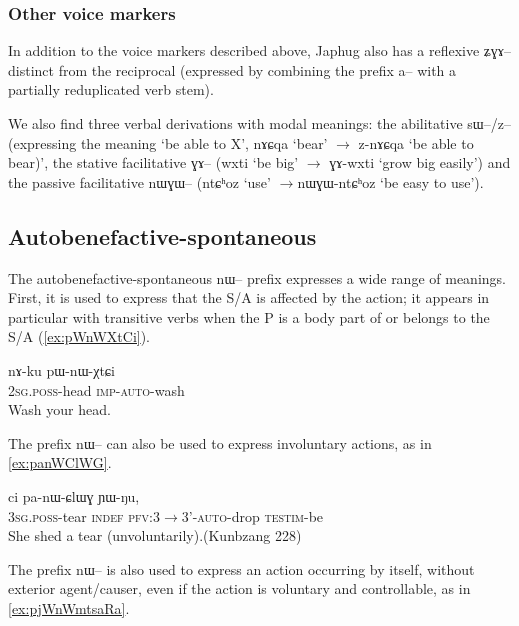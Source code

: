 \documentclass[oldfontcommands,oneside,a4paper,11pt]{article}
\newcommand{\ipa}[1]{{\phon#1}} %
\begin{document}
\subsubsection{Other voice markers}
In addition to the voice markers described above, Japhug also has a reflexive \ipa{ʑɣɤ--} distinct from the reciprocal (expressed by combining the prefix \ipa{a--} with a partially reduplicated verb stem).

We also find three verbal derivations with modal meanings: the abilitative \ipa{sɯ--/z--} (expressing the meaning `be able to X', \ipa{nɤɕqa} `bear' $\rightarrow$ \ipa{z-nɤɕqa} `be able to bear)', the stative facilitative \ipa{ɣɤ--} (\ipa{wxti} `be big' $\rightarrow$ \ipa{ɣɤ-wxti} `grow big easily') and the passive facilitative \ipa{nɯɣɯ--} (\ipa{ntɕʰoz} `use' $\rightarrow$\ipa{nɯɣɯ-ntɕʰoz} `be easy to use').
   
\subsection{Autobenefactive-spontaneous}

The autobenefactive-spontaneous \ipa{nɯ--} prefix expresses a wide range of meanings. First, it is used to express that the S/A is affected by the action; it appears in particular with transitive verbs when the P is a body part of or belongs to the S/A (\ref{ex:pWnWXtCi}).

\begin{exe}
\ex \label{ex:pWnWXtCi}
\gll 
\ipa{nɤ-ku} 	\ipa{pɯ-nɯ-χtɕi} \\
\textsc{2sg.poss}-head \textsc{imp-auto}-wash \\
\glt Wash your head.
\end{exe}

The prefix \ipa{nɯ--} can also be used to express involuntary actions, as in \ref{ex:panWClWG}.

\begin{exe}
\ex \label{ex:panWClWG}
\gll \ipa{ɯ-qom} 	\ipa{ci} 	\ipa{pa-nɯ-ɕlɯɣ} 	\ipa{ɲɯ-ŋu,} \\
\textsc{3sg.poss}-tear \textsc{indef} \textsc{pfv:3$\rightarrow$3'-auto}-drop \textsc{testim}-be \\
\glt She shed a tear (unvoluntarily).(Kunbzang 228)
\end{exe}


The prefix \ipa{nɯ--} is also used to express an action occurring by itself, without exterior agent/causer, even if the action is voluntary and controllable, as in \ref{ex:pjWnWmtsaRa}.
\end{document}

